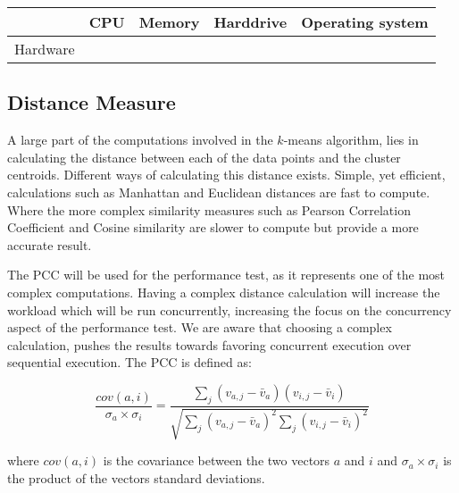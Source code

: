 \begin{center}
\begin{table}[h]
\centering
\begin{tabular}{c|cccc}
         & CPU & Memory & Harddrive & Operating system \\ \hline
Hardware &     &        &           &                 
\end{tabular}
\end{table}
 \label{tab:hardware_specs} 
\end{center}

\subsection{Distance Measure}
A large part of the computations involved in the $k$-means algorithm, lies in calculating the distance between each of the data points and the cluster centroids. Different ways of calculating this distance exists. Simple, yet efficient, calculations such as Manhattan and Euclidean\cite[p. 41]{amatriain2011data} distances are fast to compute. Where the more complex similarity measures such as Pearson Correlation Coefficient and Cosine similarity\cite[p. 42]{amatriain2011data}\cite{breese1998empirical} are slower to compute but provide a more accurate result.

The \ac{PCC} will be used for the performance test, as it represents one of the most complex computations. Having a complex distance calculation will increase the workload which will be run concurrently, increasing the focus on the concurrency aspect of the performance test. We are aware that choosing a complex calculation, pushes the results towards favoring concurrent execution over sequential execution. The \ac{PCC} is 
defined as:

\begin{equation}\label{pearsonverbose}
\frac{cov(a,i)}{\sigma_a \times \sigma_i} = \frac{\sum_j(v_{a,j}-\bar{v}_a)(v_{i,j}-\bar{v}_i)}{\sqrt{{\sum_j}(v_{a,j}-\bar{v}_a)^2 \sum_j(v_{i,j}-\bar{v}_i)^2}}
\end{equation}

where $cov(a,i)$ is the covariance between the two vectors $a$ and $i$ and $\sigma_a \times \sigma_i$ is the product of the vectors standard deviations. 
